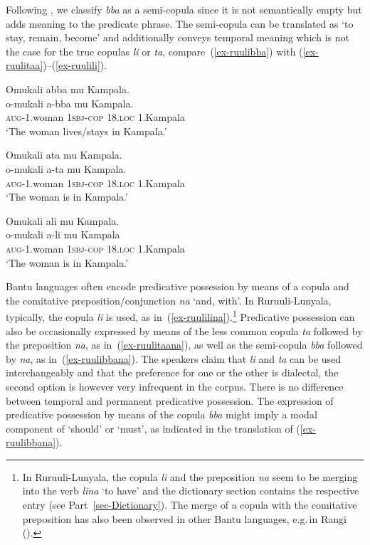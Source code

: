 Following \citet[6]{Pustet2003Copulas}, we classify \textit{bba} as a semi-copula since it is not semantically empty but adds meaning to the predicate phrase. 
The semi-copula can be translated as `to stay, remain, become' and additionally conveys temporal meaning which is not the case for the true copulas \textit{li} or \textit{ta}, 
compare~(\ref{ex-ruulibba}) with (\ref{ex-ruulitaa})–(\ref{ex-ruulili}).

\ea \label{ex-ruulinonverbal3}
\begin{xlist}
	\ex \label{ex-ruulibba}
	\glll Omukali abba mu Kampala.\\
	  o-mukali a-bba mu Kampala.\\
		\textsc{aug}-1.woman \textsc{1sbj}-\textsc{cop} 18.\textsc{loc} 1.Kampala\\
\glt ‘The woman lives/stays in Kampala.’

	\ex \label{ex-ruulitaa}
	\glll Omukali ata mu Kampala.\\
	  o-mukali a-ta mu Kampala.\\
		\textsc{aug}-1.woman \textsc{1sbj}-\textsc{cop} 18.\textsc{loc} 1.Kampala\\
\glt ‘The woman is in Kampala.’ 

	\ex \label{ex-ruulili}
	\glll Omukali ali mu Kampala.\\
		  o-mukali a-li mu Kampala\\
		\textsc{aug}-1.woman \textsc{1sbj}-\textsc{cop} 18.\textsc{loc} 	1.Kampala\\
\glt ‘The woman is in Kampala.’ 	
\end{xlist}
\z

Bantu languages often encode predicative possession by means of a copula and the comitative preposition/conjunction \textit{na} `and, with'. 
In Ru\-ruu\-li\hyp{}Lu\-nya\-la, typically, the copula \textit{li} is used, as in~(\ref{ex-ruulilina}).\footnote{In Ru\-ruu\-li\hyp{}Lu\-nya\-la, the copula \textit{li} and the preposition \textit{na} seem to be merging into the verb \textit{lina} `to have' and the dictionary section contains the respective entry (see Part~\ref{sec-Dictionary}). 
The merge of a copula with the comitative preposition has also been observed in other Bantu languages, e.g.\,in Rangi (\citealt[74]{Gibson2012Rangi}).\label{footnote-lina}}
Predicative possession can also be occasionally expressed by means of the less common copula \textit{ta} followed by the preposition \textit{na}, as in~(\ref{ex-ruulitaana}), as well as the semi-copula \textit{bba} followed by \textit{na}, as in~(\ref{ex-ruulibbana}). 
The speakers claim that \textit{li} and \textit{ta} can be used interchangeably and that the preference for one or the other is dialectal, the second option is however very infrequent in the corpus.
There is no difference between temporal and permanent predicative possession. 
The expression of predicative possession by means of the copula \textit{bba} might imply a modal component of `should' or `must', as indicated in the translation of (\ref{ex-ruulibbana}). 

